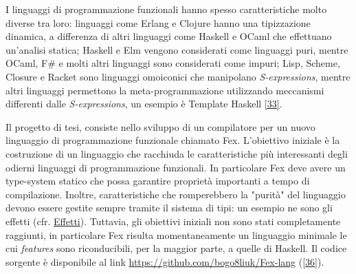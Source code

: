 \documentclass[10pt,a4paper]{article}
\begin{document}
I linguaggi di programmazione funzionali hanno spesso caratteristiche molto diverse tra loro: linguaggi come Erlang e
Clojure hanno una tipizzazione dinamica, a differenza di altri linguaggi come Haskell e OCaml che effettuano un'analisi
statica; Haskell e Elm vengono considerati come linguaggi puri, mentre OCaml, F\# e molti altri linguaggi sono
considerati come impuri; Lisp, Scheme, Closure e Racket sono linguaggi omoiconici che manipolano \textit{S-expressions},
mentre altri linguaggi permettono la meta-programmazione utilizzando meccanismi differenti dalle \textit{S-expressions}, un
esempio è Template Haskell \hyperlink{bibl33}{[33]}.

Il progetto di tesi, consiste nello sviluppo di un compilatore per un nuovo linguaggio di programmazione
funzionale chiamato Fex. L'obiettivo iniziale è la costruzione di un linguaggio che racchiuda le caratteristiche
più interessanti degli odierni linguaggi di programmazione funzionali. In particolare Fex deve avere
un type-system statico che possa
garantire proprietà importanti a tempo di compilazione. Inoltre, caratteristiche che romperebbero la "purità" del linguaggio
devono essere gestite sempre tramite il sistema di tipi: un esempio ne sono gli effetti (cfr. \hyperlink{Effetti}{Effetti}).
Tuttavia, gli obiettivi iniziali non sono stati completamente raggiunti, in particolare Fex risulta momentaneamente
un linguaggio minimale le cui \textit{features} sono riconducibili, per la maggior parte, a quelle di Haskell.
Il codice sorgente è disponibile al link \url{https://github.com/bogo8liuk/Fex-lang} (\hyperlink{bibl36}{[36]}).
\end{document}
